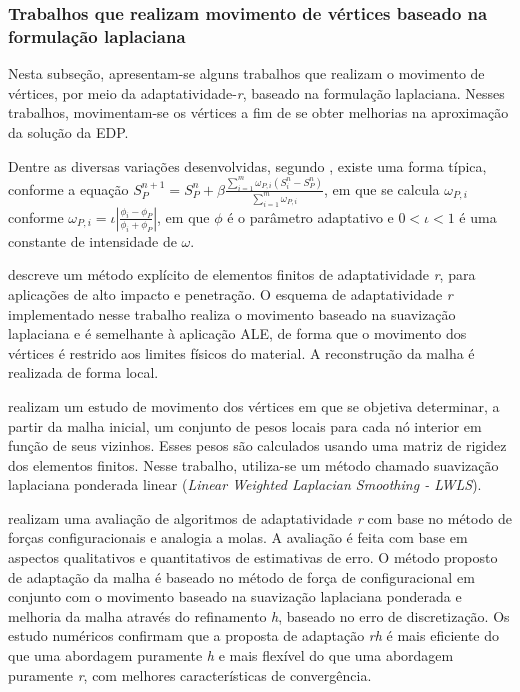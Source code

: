 \subsubsection{Trabalhos que realizam movimento de vértices baseado na formulação laplaciana}
\label{trabalhos_laplacianos}

Nesta subseção, apresentam-se alguns trabalhos que realizam o movimento de vértices, por meio da adaptatividade-{\it r}, baseado na formulação laplaciana. Nesses trabalhos, movimentam-se os vértices a fim de se obter melhorias na aproximação da solução da EDP.

Dentre as diversas variações desenvolvidas, segundo , existe uma forma típica, conforme a equação $S_{P}^{n+1} = S_{P}^{n} + \beta \frac{ \sum_{i=1}^{m} \omega_{P,i}(S_{i}^{n} - S_{P}^{n}) } { \sum_{i=1}^{m} \omega_{P,i} }$, em que se calcula $\omega_{P,i}$ conforme $\omega_{P,i} = \iota \left| \frac { \phi_{i} - \phi_{P} } {\phi_{i} + \phi_{P}} \right|$, em que $\phi$ é o parâmetro adaptativo e $ 0 < \iota < 1$ é uma constante de intensidade de $\omega$. 

 descreve um método explícito de elementos finitos de adaptatividade {\it r}, para aplicações de alto impacto e penetração. O esquema de adaptatividade {\it r} implementado nesse trabalho realiza o movimento baseado na suavização laplaciana e é semelhante à aplicação ALE, de forma que o movimento dos vértices é restrido aos limites físicos do material. A reconstrução da malha é realizada de forma local.

 realizam um estudo de movimento dos vértices em que se objetiva determinar, a partir da malha inicial, um conjunto de pesos locais para cada nó interior em função de seus vizinhos. Esses pesos são calculados usando uma matriz de rigidez dos elementos finitos. Nesse trabalho, utiliza-se um método chamado suavização laplaciana ponderada linear ({\it Linear Weighted Laplacian Smoothing - LWLS}).

 realizam uma avaliação de algoritmos de adaptatividade {\it r} com base no método de forças configuracionais e analogia a molas.  A avaliação é feita com base em aspectos qualitativos e quantitativos de estimativas de erro. O método proposto de adaptação da malha é baseado no método de força de configuracional em conjunto com o movimento baseado na suavização laplaciana ponderada e melhoria da malha através do refinamento {\it h}, baseado no erro de discretização. Os estudo numéricos confirmam que a proposta de adaptação {\it rh} é mais eficiente do que uma abordagem puramente {\it h} e mais flexível do que uma abordagem puramente {\it r}, com melhores características de convergência.

